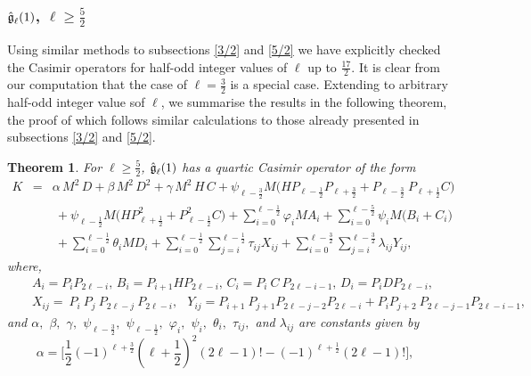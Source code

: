 \documentclass[12pt]{article}
\newtheorem{thm}{Theorem}
\begin{document}
\subsubsection{$\mathfrak{\Hat{g}}_\ell(1)$, $\ell\geq \frac52$}

Using similar methods to subsections \ref{3/2} and \ref{5/2} we have explicitly
checked the Casimir operators for half-odd integer values of $\ell$ up to
$\frac{17}{2}$. It is clear from our computation that the case of
$\ell=\frac{3}{2}$ is a special case. Extending to arbitrary half-odd integer
value sof $\ell$, we summarise the results in the
following theorem, the proof of which follows similar calculations to those
already presented in subsections \ref{3/2} and \ref{5/2}. 
\begin{thm}
For $\ell \geq\frac{5}{2}$, $\mathfrak{\Hat{g}}_\ell(1)$ has a quartic Casimir operator of the form 
\begin{eqnarray}
K&=& \alpha  \, M^2 \,D +\beta \, M^2 \,D^{2} +\gamma \, M^2\, H\, C + \psi_{\ell- \frac{3}{2}}M \Bigg(  H P_{\ell - \frac{1}{2}}P_{\ell +\frac{3}{2}}+ P_{\ell - \frac{3}{2}} \ P_{\ell + \frac{1}{2}} C\Bigg) \nonumber \\
 &&\  + \psi_{\ell- \frac{1}{2}}M \Bigg(  H P^2_{\ell + \frac{1}{2}} + P^2_{\ell - \frac{1}{2}}   C\Bigg)+ \sum\limits_{i=0}^{\ell-\frac{1}{2}}\varphi_{i}M  A_{i}+ \sum\limits_{i=0}^{\ell-\frac{5}{2}} \psi_{i}M \Bigg(B_{i}+ C_{i}\Bigg)\nonumber \\
 &&\ + \sum\limits_{i=0}^{\ell-\frac{1}{2}}  \theta_{i}M D_{i}+ \sum\limits_{i=0}^{\ell-\frac{1}{2}}   \sum\limits_{j=i}^{\ell-\frac{1}{2}}  \tau_{ij} X_{ij} +   
\sum\limits_{i=0}^{\ell-\frac{3}{2}}   \sum\limits_{j=i}^{\ell-\frac{3}{2}} \lambda_{ij} Y_{ij},\label{TR1}   
\end{eqnarray} where, 
\begin{eqnarray*}
 &&A_{i}=P_{i}P_{2\ell-i}, \, B_{i}=  P_{i+1}HP_{2\ell-i}, \, C_{i} =P_{i} \ C \ P_{2\ell-i-1}, \,  D_{i} = P_{i}D P_{2\ell-i},  
 \\&& 
  X_{ij} = \  P_{i} \ P_{j} \ P_{2\ell-j} \ P_{2\ell-i}  , \,\,\,\  Y_{ij}= P_{i+1} \ P_{j+1} P_{2\ell-j-2} P_{2\ell-i}+ P_{i} P_{j+2} \ P_{2\ell-j-1} P_{2\ell-i-1},    
\end{eqnarray*}
and $\alpha,$ $\beta,$ $\gamma,$ $\psi_{\ell- \frac{3}{2}},$ $\psi_{\ell-
	\frac{1}{2}},$ $\varphi_{i},$ $\psi_{i},$ $\theta_{i},$ $\tau_{ij},$
	and $\lambda_{ij}$ are constants given by 
$$
 \alpha = \Big[\frac{1}{2}  (-1)^{\ell+\frac{3}{2}}(\ell+\frac{1}{2})^{2} (2\ell-1)!  -(-1)^{\ell+\frac{1}{2}}(2\ell-1)!  \Big] , \quad 
$$
\end{thm}
\end{document}
